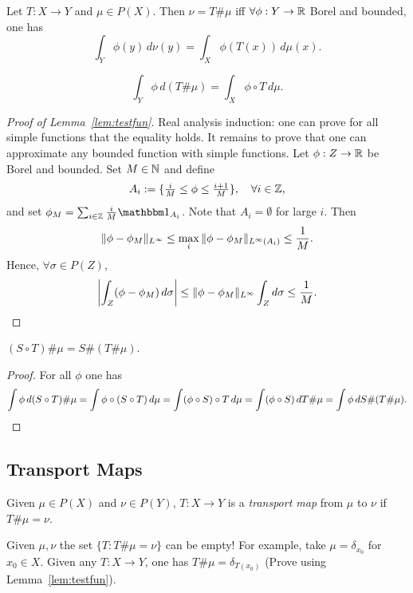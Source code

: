 \begin{lemma}\label{lem:testfun}
    Let $T:X\to Y$ and $\mu\in P(X)$. Then $\nu = T\#\mu$ iff $\forall \phi:Y\to\mathbb{R}$ Borel and bounded, one has \[
        \int_Y \phi(y)\, d\nu(y) =  \int_X \phi(T(x))\,d\mu(x).
    \] 
\end{lemma}
\begin{corollary}
    \[
        \int_Y \phi\, d(T\#\mu) = \int_X \phi\circ T\, d\mu.
    \] 
\end{corollary}
\begin{proof}[Proof of Lemma~\ref{lem:testfun}]
    Real analysis induction: one can prove for all simple functions that the equality holds. It remains to prove that one can approximate any bounded function with simple functions. Let $\phi:Z\to \mathbb{R}$ be Borel and bounded. Set $M\in\mathbb{N}$ and define
    \[
        A_i := \{ \tfrac{i}{M} \leq \phi \leq \tfrac{i+1}{M} \}, \quad\forall i\in\mathbb{Z},
    \] 
    and set $\phi_M = \sum_{i \in \ZZ} \frac{i}{M} \indic_{A_i}$. Note that $A_i = \emptyset$ for large $i$. Then 
    \[
        \|\phi - \phi_M\|_{L^\infty} \leq \max_i \|\phi - \phi_M\|_{L^\infty(A_i)} \leq \frac{1}{M}.
    \] 
    Hence, $\forall\sigma\in P(Z)$, \[
        \left| \int_Z (\phi - \phi_M)\, d\sigma\right| \leq \|\phi - \phi_M\|_{L^\infty}\int_Z d\sigma \leq \frac{1}{M}.\qedhere
    \] 
\end{proof}
\begin{lemma}
    $(S \circ T)\# \mu = S\#(T\#\mu)$.
\end{lemma}
\begin{proof}
    For all $\phi$ one has
    \[
        \int \phi\, d(S\circ T)\#\mu = \int \phi \circ (S \circ T)\, d\mu = \int (\phi \circ S) \circ T\, d\mu = \int (\phi \circ S)\,dT\#\mu = \int \phi\, dS\#(T\#\mu). \qedhere
    \] 
\end{proof}

\subsection{Transport Maps}
Given $\mu \in P(X)$ and $\nu \in P(Y)$, $T:X\to Y$ is a \emph{transport map} from $\mu$ to $\nu$ if $T\#\mu = \nu$. 
\begin{remark}
    Given $\mu, \nu$ the set $\{T:T\#\mu = \nu\}$ can be empty! For example, take $\mu = \delta_{x_0}$ for $x_0 \in X$. Given any $T:X\to Y$, one has $T\#\mu = \delta_{T(x_0)}$ (Prove using Lemma~\ref{lem:testfun}).
\end{remark}

